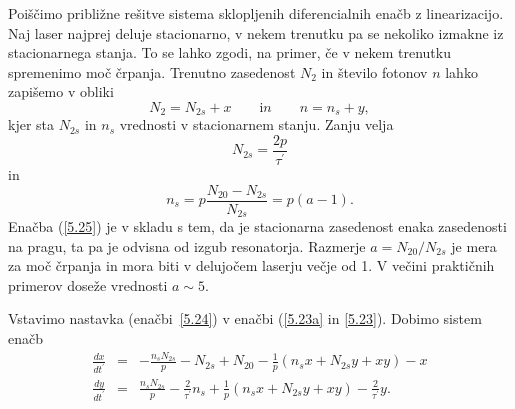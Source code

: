 Poiščimo približne rešitve sistema sklopljenih diferencialnih enačb z 
linearizacijo. Naj laser najprej deluje stacionarno, v nekem trenutku pa se 
nekoliko izmakne iz stacionarnega stanja. To se lahko zgodi, na primer, če v nekem 
trenutku spremenimo moč črpanja. Trenutno zasedenost $N_2$ in število fotonov $n$
lahko zapišemo v obliki 
\begin{equation}  
N_2= N_{2s}+x \qquad {\mathrm in} \qquad n=n_s+y,
\label{5.24}
\end{equation}
kjer sta $N_{2s}$ in $n_s$ vrednosti v stacionarnem stanju. Zanju velja 
\begin{equation}  
N_{2s}=\frac{2p}{\tau^{\prime}}
\label{5.25}
\end{equation}
in 
\begin{equation} 
n_s=p\frac{N_{20}-N_{2s}}{N_{2s}}=p(a-1).
\label{5.26}
\end{equation}
Enačba (\ref{5.25}) je v skladu s tem, da je stacionarna zasedenost 
enaka zasedenosti na pragu, ta pa je odvisna od izgub resonatorja. 
Razmerje $a=N_{20}/N_{2s}$ je mera za moč črpanja in
mora biti v delujočem laserju večje od 1. V večini praktičnih primerov
doseže vrednosti $a \sim 5$.

Vstavimo nastavka (enačbi~\ref{5.24}) v enačbi (\ref{5.23a} in \ref{5.23}). 
Dobimo sistem enačb
\begin{eqnarray}  
\frac{d x}{d t^{\prime}} &=&-\frac{n_sN_{2s}}{p}-N_{2s}+N_{20}- \frac{1}{p}
(n_sx+N_{2s}y+xy)-x \\
\frac{d y}{d t^{\prime}} &=& \frac{n_sN_{2s}}{p}-\frac{2}{\tau^{\prime}}n_s
+ \frac{1}{p}(n_s x+N_{2s} y+xy)-\frac{2}{\tau^{\prime}}y.
\label{5.27}
\end{eqnarray}

